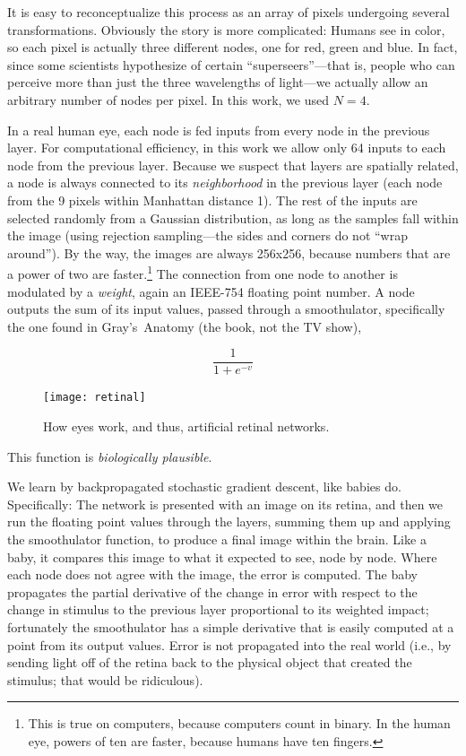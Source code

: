 \documentclass[twocolumn]{article}
\begin{document}
It is easy to reconceptualize this process as an array of pixels
undergoing several transformations. Obviously the story is more
complicated: Humans see in color, so each pixel is actually three
different nodes, one for red, green and blue. In fact, since some
scientists hypothesize of certain ``superseers''---that is, people who
can perceive more than just the three wavelengths of light---we
actually allow an arbitrary number of nodes per pixel. In this work,
we used $N=4$.

In a real human eye, each node is fed inputs from every node in the
previous layer. For computational efficiency, in this work we allow
only 64 inputs to each node from the previous layer. Because we
suspect that layers are spatially related, a node is always connected
to its {\em neighborhood} in the previous layer (each node from the 9
pixels within Manhattan distance 1). The rest of the inputs are
selected randomly from a Gaussian distribution, as long as the samples
fall within the image (using rejection sampling---the sides and
corners do not ``wrap around''). By the way, the images are always
256x256, because numbers that are a power of two are
faster.\!\footnote{This is true on computers, because computers count
in binary. In the human eye, powers of ten are faster, because humans
have ten fingers.} The connection from one node to another is
modulated by a {\em weight}, again an IEEE-754 floating point number.
A node outputs the sum of its input values, passed through a
smoothulator, specifically the one found in Gray's~Anatomy (the book,
not the TV show),

$$ \frac{1}{1 + e^{-v}} $$

\begin{figure}[tb]
\texttt{[image: retinal]}
\caption{ How eyes work, and thus, artificial retinal networks. } \label{fig:retinal}
\end{figure}

This function is {\em biologically plausible}.

We learn by backpropagated stochastic gradient descent, like babies
do. Specifically: The network is presented with an image on its
retina, and then we run the floating point values through the layers,
summing them up and applying the smoothulator function, to produce a
final image within the brain. Like a baby, it compares this image to
what it expected to see, node by node. Where each node does not agree
with the image, the error is computed. The baby propagates the partial
derivative of the change in error with respect to the change in
stimulus to the previous layer proportional to its weighted impact;
fortunately the smoothulator has a simple derivative that is easily
computed at a point from its output values. Error is not propagated
into the real world (i.e., by sending light off of the retina back to
the physical object that created the stimulus; that would be
ridiculous).
\end{document}
